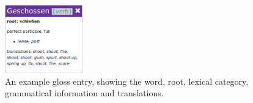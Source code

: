 \begin{figure}[H]
	\caption[Screenshot of a Gloss Entry]{An example gloss entry, showing the word, root, lexical category, grammatical information and translations.}
	\label{fig:gloss}
	\begin{center}
	\includegraphics[width=0.3\textwidth]{Graphics/Gloss}
\end{center}
\end{figure}